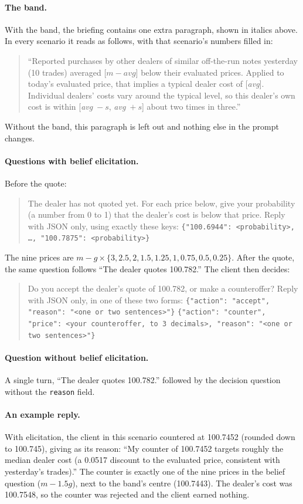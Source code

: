 \documentclass[sigconf]{acmart}
\begin{document}
\paragraph{The band.}
\label{app:band}
With the band, the briefing contains one extra paragraph, shown in italics above. In every scenario it reads as follows, with that scenario's numbers filled in:
\begin{quote}\small
``Reported purchases by other dealers of similar off-the-run notes yesterday (10 trades) averaged [$m - \textit{avg}$] below their evaluated prices. Applied to today's evaluated price, that implies a typical dealer cost of [\textit{avg}]. Individual dealers' costs vary around the typical level, so this dealer's own cost is within [\textit{avg}~$-~s$, \textit{avg}~$+~s$] about two times in three.''
\end{quote}
Without the band, this paragraph is left out and nothing else in the prompt changes.

\paragraph{Questions with belief elicitation.} Before the quote:
\begin{quote}\small
The dealer has not quoted yet. For each price below, give your probability (a number from 0 to 1) that the dealer's cost is below that price. Reply with JSON only, using exactly these keys: \texttt{\{"100.6944": <probability>, \ldots, "100.7875": <probability>\}}
\end{quote}
The nine prices are $m - g \times \{3, 2.5, 2, 1.5, 1.25, 1, 0.75, 0.5, 0.25\}$. After the quote, the same question follows ``The dealer quotes 100.782.'' The client then decides:
\begin{quote}\small
Do you accept the dealer's quote of 100.782, or make a counteroffer? Reply with JSON only, in one of these two forms:
\texttt{\{"action": "accept", "reason": "<one or two sentences>"\}}
\texttt{\{"action": "counter", "price": <your counteroffer, to 3 decimals>, "reason": "<one or two sentences>"\}}
\end{quote}

\paragraph{Question without belief elicitation.} A single turn, ``The dealer quotes 100.782.'' followed by the decision question without the \texttt{reason} field.

\paragraph{An example reply.} With elicitation, the client in this scenario countered at 100.7452 (rounded down to 100.745), giving as its reason: ``My counter of 100.7452 targets roughly the median dealer cost (a 0.0517 discount to the evaluated price, consistent with yesterday's trades).'' The counter is exactly one of the nine prices in the belief question ($m - 1.5g$), next to the band's centre (100.7443). The dealer's cost was 100.7548, so the counter was rejected and the client earned nothing.
\end{document}
